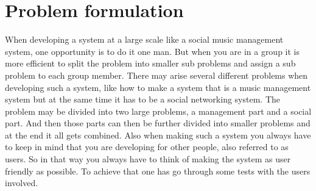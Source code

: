 \section{Problem formulation}
When developing a system at a large scale like a social music management system,
one opportunity is to do it one man. 
But when you are in a group it is more efficient to split the problem into 
smaller sub problems and assign a sub problem to each group member. 
There may arise several different problems when developing such a system, 
like how to make a system that is a music management system but at the same 
time it has to be a social networking system.
The problem may be divided into two large problems, 
a management part and a social part. And then those parts can then be further 
divided into smaller problems and at the end it all gets combined.
Also when making such a system you always have to keep in mind that you are 
developing for other people, also referred to as users.
So in that way you always have to think of making the system as user friendly 
as possible. To achieve that one has go through some tests with the users 
involved. 